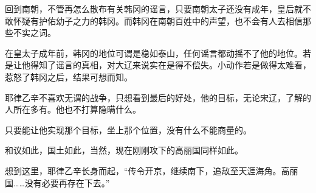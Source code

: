 回到南朝，不管再怎么散布有关韩冈的谣言，只要南朝太子还没有成年，皇后就不敢怀疑有护佑幼子之力的韩冈。而韩冈在南朝百姓中的声望，也不会有人去相信那些不实之词。

在皇太子成年前，韩冈的地位可谓是稳如泰山，任何谣言都动摇不了他的地位。若是让他得知了谣言的真相，对大辽来说实在是得不偿失。小动作若是做得太难看，惹怒了韩冈之后，结果可想而知。

耶律乙辛不喜欢无谓的战争，只想看到最后的好处，他的目标，无论宋辽，了解的人所在多有。他也不打算隐瞒什么。

只要能让他实现那个目标，坐上那个位置，没有什么不能商量的。

和议如此，国土如此，当然，现在刚刚攻下的高丽国同样如此。

想到这里，耶律乙辛长身而起，“传令开京，继续南下，追敌至天涯海角。高丽国……没有必要再存在下去。”

